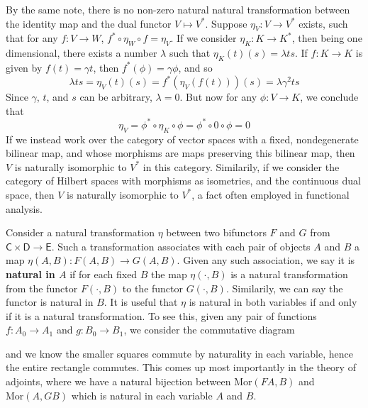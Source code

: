 \begin{example}
    By the same note, there is no non-zero natural natural transformation between the identity map and the dual functor $V \mapsto V^*$. Suppose $\eta_V: V \to V^*$ exists, such that for any $f: V \to W$, $f^* \circ \eta_W \circ f = \eta_V$. If we consider $\eta_K: K \to K^*$, then being one dimensional, there exists a number $\lambda$ such that $\eta_K(t)(s) = \lambda ts$. If $f: K \to K$ is given by $f(t) = \gamma t$, then $f^*(\phi) = \gamma \phi$, and so
    \[ \lambda ts = \eta_V(t)(s) = f^*(\eta_V(f(t)))(s) = \lambda \gamma^2 ts \]
    Since $\gamma$, $t$, and $s$ can be arbitrary, $\lambda = 0$. But now for any $\phi: V \to K$, we conclude that
    \[ \eta_V = \phi^* \circ \eta_K \circ \phi = \phi^* \circ 0 \circ \phi = 0 \]
    If we instead work over the category of vector spaces with a fixed, nondegenerate bilinear map, and whose morphisms are maps preserving this bilinear map, then $V$ is naturally isomorphic to $V^*$ in this category. Similarily, if we consider the category of Hilbert spaces with morphisms as isometries, and the continuous dual space, then $V$ is naturally isomorphic to $V^*$, a fact often employed in functional analysis.
\end{example}

Consider a natural transformation $\eta$ between two bifunctors $F$ and $G$ from $\mathsf{C} \times \mathsf{D} \to \mathsf{E}$. Such a transformation associates with each pair of objects $A$ and $B$ a map $\eta(A,B): F(A,B) \to G(A,B)$. Given any such association, we say it is {\bf natural in $A$} if for each fixed $B$ the map $\eta(\cdot,B)$ is a natural transformation from the functor $F(\cdot,B)$ to the functor $G(\cdot,B)$. Similarily, we can say the functor is natural in $B$. It is useful that $\eta$ is natural in both variables if and only if it is a natural transformation. To see this, given any pair of functions $f: A_0 \to A_1$ and $g: B_0 \to B_1$, we consider the commutative diagram
%
\begin{center}
\end{center}
%
and we know the smaller squares commute by naturality in each variable, hence the entire rectangle commutes. This comes up most importantly in the theory of adjoints, where we have a natural bijection between $\text{Mor}(FA,B)$ and $\text{Mor}(A,GB)$ which is natural in each variable $A$ and $B$.

